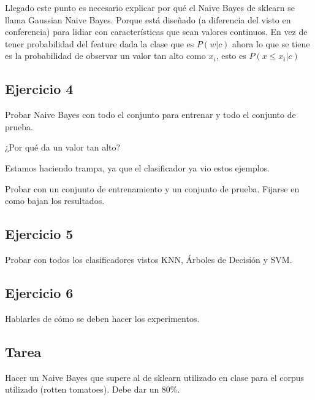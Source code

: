 \documentclass[a4paper,10pt]{article}
\begin{document}
    Llegado este punto es necesario explicar por qué el Naive Bayes
    de sklearn se llama Gaussian Naive Bayes. Porque está diseñado 
    (a diferencia del visto en conferencia) para lidiar con características que 
    sean valores continuos. En vez de tener probabilidad del feature dada la clase
    que es $P(w|c)$ ahora lo que se tiene es la probabilidad de observar 
    un valor tan alto como $x_i$, esto es $P(x \leq x_i| c)$
    
    
   \subsection*{Ejercicio 4}
    
    Probar Naive Bayes con todo el conjunto para entrenar y todo el 
    conjunto de prueba.
    
    ¿Por qué da un valor tan alto?
    
    Estamos haciendo trampa, ya que el clasificador ya vio estos ejemplos.
    
    Probar con un conjunto de entrenamiento y un conjunto de prueba.
    Fijarse en como bajan los resultados.
    
  \subsection*{Ejercicio 5}
  	Probar con todos los clasificadores vistos KNN, Árboles de Decisión y SVM. 
    
  \subsection*{Ejercicio 6}
	Hablarles de cómo se deben hacer los experimentos.    
    
  \subsection*{Tarea}
    Hacer un Naive Bayes que supere al de sklearn utilizado en clase para
    el corpus utilizado (rotten tomatoes). Debe dar un 80\%. 
    
\end{document}
